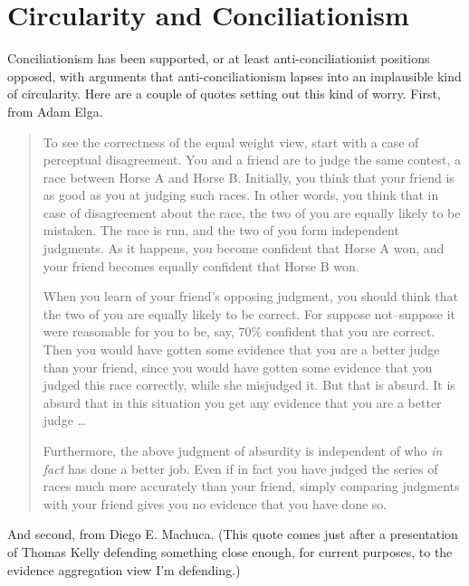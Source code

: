 \section{Circularity and Conciliationism}
\label{circularityandconciliationism}

Conciliationism has been supported, or at least anti-conciliationist positions opposed, with arguments that anti-conciliationism lapses into an implausible kind of circularity. Here are a couple of quotes setting out this kind of worry. First, from Adam Elga.

\begin{quote}
To see the correctness of the equal weight view, start with a case of perceptual disagreement. You and a friend are to judge the same contest, a race between Horse A and Horse B. Initially, you think that your friend is as good as you at judging such races. In other words, you think that in case of disagreement about the race, the two of you are equally likely to be mistaken. The race is run, and the two of you form independent judgments. As it happens, you become confident that Horse A won, and your friend becomes equally confident that Horse B won.

When you learn of your friend's opposing judgment, you should think that the two of you are equally likely to be correct. For suppose not--suppose it were reasonable for you to be, say, 70\% confident that you are correct. Then you would have gotten some evidence that you are a better judge than your friend, since you would have gotten some evidence that you judged this race correctly, while she misjudged it. But that is absurd. It is absurd that in this situation you get any evidence that you are a better judge {\ldots}

Furthermore, the above judgment of absurdity is independent of who \emph{in fact} has done a better job. Even if in fact you have judged the series of races much more accurately than your friend, simply comparing judgments with your friend gives you no evidence that you have done so. ~\citep[486-7, emphasis in original]{Elga2007}
\end{quote}
And second, from Diego E. Machuca. (This quote comes just after a presentation of Thomas Kelly defending something close enough, for current purposes, to the evidence aggregation view I'm defending.)


